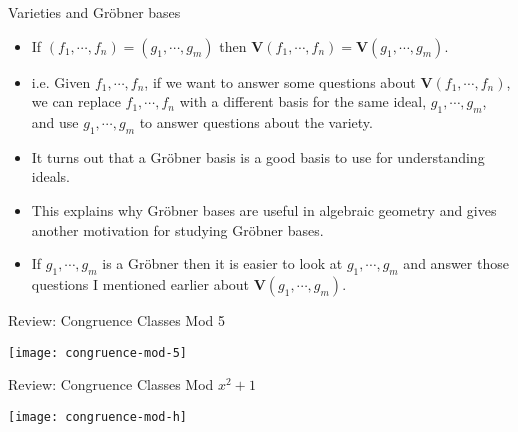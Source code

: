 \documentclass{beamer}
\begin{document}

\begin{frame}{Varieties and Gr\"{o}bner bases}

\begin{itemize}
  \item If $(f_1,\cdots,f_n) = (g_1,\cdots,g_m)$ then $\mathbf{V}(f_1,\cdots,f_n) = \mathbf{V}(g_1,\cdots,g_m)$.
  \item i.e. Given $f_1,\cdots,f_n$, if we want to answer some questions about $\mathbf{V}(f_1,\cdots,f_n)$,
  we can replace $f_1,\cdots,f_n$ with a different basis for the same ideal, $g_1,\cdots,g_m$, and use
  $g_1,\cdots,g_m$ to answer questions about the variety.
  \item It turns out that a Gr\"{o}bner basis is a good basis to use for understanding ideals.
  \item This explains why Gr\"{o}bner bases are useful in algebraic geometry and gives another motivation for studying Gr\"{o}bner bases.
  \item If $g_1,\cdots,g_m$ is a Gr\"{o}bner then it is easier to look at $g_1,\cdots,g_m$ and answer those questions I mentioned earlier
  about $\mathbf{V}(g_1,\cdots,g_m)$.

\end{itemize}
\end{frame}



\begin{frame}{Review: Congruence Classes Mod 5}

\begin{center}
\texttt{[image: congruence-mod-5]}
\end{center}

\end{frame}



\begin{frame}{Review: Congruence Classes Mod $x^2 + 1$}

\begin{center}
\texttt{[image: congruence-mod-h]}
\end{center}

\end{frame}


\end{document}
